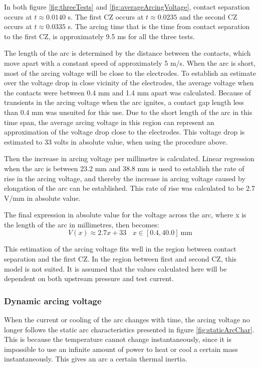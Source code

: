 \documentclass[10pt,b5paper,twoside]{article}
\begin{document}
In both figure \ref{fig:threeTests} and \ref{fig:averageArcingVoltage}, contact separation occurs at $t \approx 0.0140$ s. The first CZ occurs at $t \approx 0.0235$ and the second CZ occurs at $t \approx 0.0335$ s. The arcing time that is the time from contact separation to the first CZ, is approximately 9.5 ms for all the three tests.

The length of the arc is determined by the distance between the contacts, which move apart with a constant speed of approximately 5 m$/$s. When the arc is short, most of the arcing voltage will be close to the electrodes. To establish an estimate over the voltage drop in close vicinity of the electrodes, the average voltage when the contacts were between 0.4 mm and 1.4 mm apart was calculated. Because of transients in the arcing voltage when the arc ignites, a contact gap length less than 0.4 mm was unsuited for this use. Due to the short length of the arc in this time span, the average arcing voltage in this region can represent an approximation of the voltage drop close to the electrodes. This voltage drop is estimated to 33 volts in absolute value, when using the procedure above.

Then the increase in arcing voltage per millimetre is calculated. Linear regression when the arc is between 23.2 mm and 38.8 mm is used to establish the rate of rise in the arcing voltage, and thereby the increase in arcing voltage caused by elongation of the arc can be established. This rate of rise was calculated to be 2.7 V$/$mm in absolute value.

The final expression in absolute value for the voltage across the arc, where x is the length of the arc in millimetres, then becomes:
\begin{equation}
V(x) \approx 2.7x+33 \ \ \ \ x \in [0.4, 40.0] \ \mathrm{mm}
\end{equation}

This estimation of the arcing voltage fits well in the region between contact separation and the first CZ. In the region between first and second CZ, this model is not suited. It is assumed that the values calculated here will be dependent on both upstream pressure and test current.


\subsubsection{Dynamic arcing voltage} \label{sec:dynARC}
When the current or cooling of the arc changes with time, the arcing voltage no longer follows the static arc characteristics presented in figure \ref{fig:staticArcChar}. This is because the temperature cannot change instantaneously, since it is impossible to use an infinite amount of power to heat or cool a certain mass instantaneously. This gives an arc a certain thermal inertia.
\end{document}
